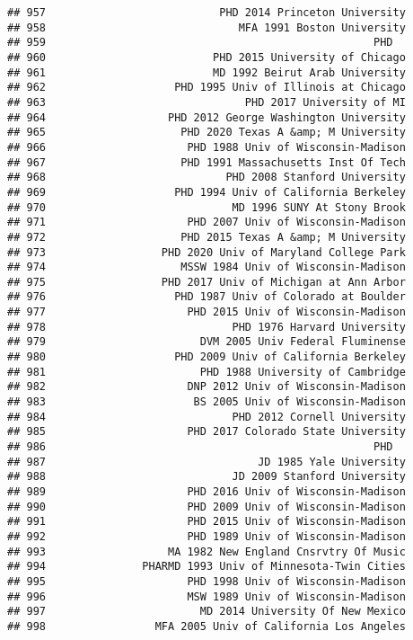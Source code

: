 \documentclass[
]{article}
\begin{document}
\begin{verbatim}
## 957                           PHD 2014 Princeton University
## 958                              MFA 1991 Boston University
## 959                                                   PHD  
## 960                          PHD 2015 University of Chicago
## 961                          MD 1992 Beirut Arab University
## 962                    PHD 1995 Univ of Illinois at Chicago
## 963                               PHD 2017 University of MI
## 964                   PHD 2012 George Washington University
## 965                     PHD 2020 Texas A &amp; M University
## 966                      PHD 1988 Univ of Wisconsin-Madison
## 967                     PHD 1991 Massachusetts Inst Of Tech
## 968                            PHD 2008 Stanford University
## 969                    PHD 1994 Univ of California Berkeley
## 970                             MD 1996 SUNY At Stony Brook
## 971                      PHD 2007 Univ of Wisconsin-Madison
## 972                     PHD 2015 Texas A &amp; M University
## 973                  PHD 2020 Univ of Maryland College Park
## 974                     MSSW 1984 Univ of Wisconsin-Madison
## 975                  PHD 2017 Univ of Michigan at Ann Arbor
## 976                    PHD 1987 Univ of Colorado at Boulder
## 977                      PHD 2015 Univ of Wisconsin-Madison
## 978                             PHD 1976 Harvard University
## 979                        DVM 2005 Univ Federal Fluminense
## 980                    PHD 2009 Univ of California Berkeley
## 981                        PHD 1988 University of Cambridge
## 982                      DNP 2012 Univ of Wisconsin-Madison
## 983                       BS 2005 Univ of Wisconsin-Madison
## 984                             PHD 2012 Cornell University
## 985                      PHD 2017 Colorado State University
## 986                                                   PHD  
## 987                                 JD 1985 Yale University
## 988                             JD 2009 Stanford University
## 989                      PHD 2016 Univ of Wisconsin-Madison
## 990                      PHD 2009 Univ of Wisconsin-Madison
## 991                      PHD 2015 Univ of Wisconsin-Madison
## 992                      PHD 1989 Univ of Wisconsin-Madison
## 993                   MA 1982 New England Cnsrvtry Of Music
## 994               PHARMD 1993 Univ of Minnesota-Twin Cities
## 995                      PHD 1998 Univ of Wisconsin-Madison
## 996                      MSW 1989 Univ of Wisconsin-Madison
## 997                        MD 2014 University Of New Mexico
## 998                 MFA 2005 Univ of California Los Angeles

\end{verbatim}
\end{document}
